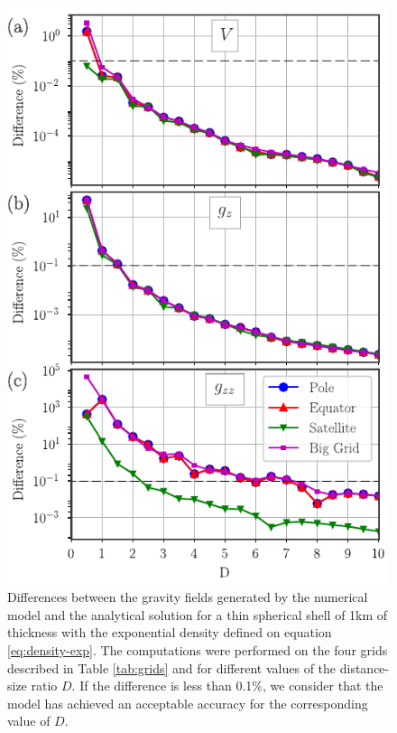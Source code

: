 \documentclass[extra]{gji}
\begin{document}
\begin{figure}
\centering
\includegraphics[width=0.9\linewidth]{figures/Dexp-shifted-thin-differences.pdf}
\caption{
    Differences between the gravity fields generated by the numerical model and the analytical solution for a thin spherical shell of 1km of thickness with the exponential density defined on equation \ref{eq:density-exp}. The computations were performed on the four grids described in Table \ref{tab:grids} and for different values of the distance-size ratio $D$. If the difference is less than 0.1\%, we consider that the model has achieved an acceptable accuracy for the corresponding value of $D$.
}
\label{fig:D-exp-thin}
\end{figure}
\end{document}
